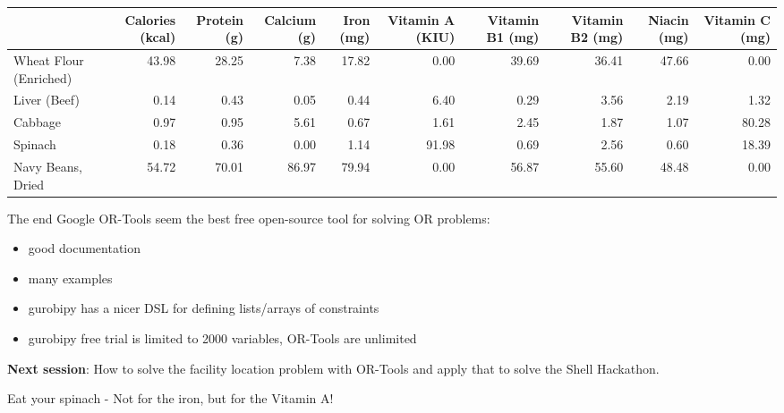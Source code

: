 \documentclass[
  ignorenonframetext,
]{beamer}
\providecommand{\tightlist}{%
  \setlength{\itemsep}{0pt}\setlength{\parskip}{0pt}}\usepackage{longtable,booktabs,array}
\begin{document}
\begin{frame}[fragile]
\begin{tabular}{lrrrrrrrrr}
\toprule
{} &  Calories (kcal) &  Protein (g) &  Calcium (g) &  Iron (mg) &  Vitamin A (KIU) &  Vitamin B1 (mg) &  Vitamin B2 (mg) &  Niacin (mg) &  Vitamin C (mg) \\
\midrule
Wheat Flour (Enriched) &            43.98 &        28.25 &         7.38 &      17.82 &             0.00 &            39.69 &            36.41 &        47.66 &            0.00 \\
Liver (Beef)           &             0.14 &         0.43 &         0.05 &       0.44 &             6.40 &             0.29 &             3.56 &         2.19 &            1.32 \\
Cabbage                &             0.97 &         0.95 &         5.61 &       0.67 &             1.61 &             2.45 &             1.87 &         1.07 &           80.28 \\
Spinach                &             0.18 &         0.36 &         0.00 &       1.14 &            91.98 &             0.69 &             2.56 &         0.60 &           18.39 \\
Navy Beans, Dried      &            54.72 &        70.01 &        86.97 &      79.94 &             0.00 &            56.87 &            55.60 &        48.48 &            0.00 \\
\bottomrule
\end{tabular}

\begin{block}{The end}
\protect\hypertarget{the-end}{}
Google OR-Tools seem the best free open-source tool for solving OR
problems:

\begin{itemize}
\tightlist
\item
  good documentation
\item
  many examples
\item
  gurobipy has a nicer DSL for defining lists/arrays of constraints
\item
  gurobipy free trial is limited to 2000 variables, OR-Tools are
  unlimited
\end{itemize}

\textbf{Next session}: How to solve the facility location problem with
OR-Tools and apply that to solve the Shell Hackathon.

{Eat your spinach - Not for the iron, but for the Vitamin A!}
\end{block}
\end{frame}
\end{document}
